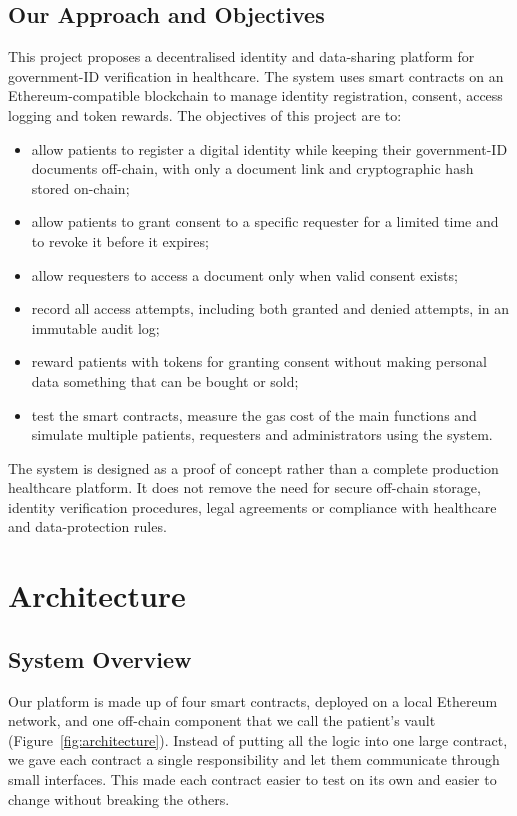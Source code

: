 \documentclass[10pt,a4paper]{article}
\begin{document}
\subsection{Our Approach and Objectives}

This project proposes a decentralised identity and data-sharing platform for government-ID verification in healthcare. The system uses smart contracts on an Ethereum-compatible blockchain to manage identity registration, consent, access logging and token rewards. The objectives of this project are to:
\begin{itemize}
  \item allow patients to register a digital identity while keeping their government-ID documents off-chain, with only a document link and cryptographic hash stored on-chain;
  \item allow patients to grant consent to a specific requester for a limited time and to revoke it before it expires;
  \item allow requesters to access a document only when valid consent exists;
  \item record all access attempts, including both granted and denied attempts, in an immutable audit log;
  \item reward patients with tokens for granting consent without making personal data something that can be bought or sold;
  \item test the smart contracts, measure the gas cost of the main functions and simulate multiple patients, requesters and administrators using the system.
\end{itemize}

The system is designed as a proof of concept rather than a complete production healthcare platform. It does not remove the need for secure off-chain storage, identity verification procedures, legal agreements or compliance with healthcare and data-protection rules.

\section{Architecture}

\subsection{System Overview}

Our platform is made up of four smart contracts, deployed on a local Ethereum network, and one off-chain component that we call the patient's vault (Figure~\ref{fig:architecture}). Instead of putting all the logic into one large contract, we gave each contract a single responsibility and let them communicate through small interfaces. This made each contract easier to test on its own and easier to change without breaking the others.
\end{document}
